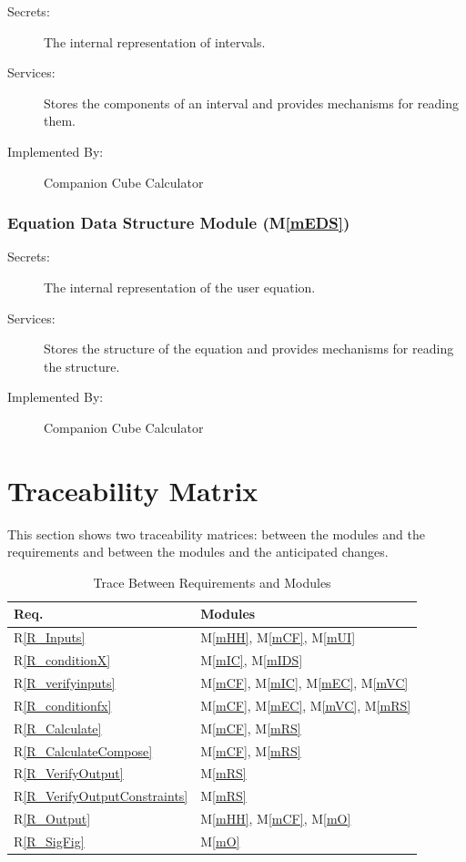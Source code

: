 \documentclass[12pt, titlepage]{article}
\newcommand{\rref}[1]{R\ref{#1}}
\newcommand{\mref}[1]{M\ref{#1}}
\newcommand{\progname}{Companion Cube Calculator} %
\begin{document}
\begin{description}
	\item[Secrets:]The internal representation of intervals.
	\item[Services:]Stores the components of an interval and provides 
	mechanisms for reading them.
	\item[Implemented By:] \progname{}
\end{description}

\subsubsection{Equation Data Structure Module (\mref{mEDS})}

\begin{description}
	\item[Secrets:]The internal representation of the user equation.
	\item[Services:]Stores the structure of the equation and provides 
	mechanisms for reading the structure.
	\item[Implemented By:] \progname{}
\end{description}

\section{Traceability Matrix} \label{SecTM}

This section shows two traceability matrices: between the modules and the
requirements and between the modules and the anticipated changes.


\begin{table}[H]
\centering
\begin{tabular}{p{} p{}}
\toprule
\textbf{Req.} & \textbf{Modules}\\
\midrule
\rref{R_Inputs} & \mref{mHH}, \mref{mCF}, \mref{mUI}\\
\rref{R_conditionX} & \mref{mIC}, \mref{mIDS}\\
\rref{R_verifyinputs} & \mref{mCF}, \mref{mIC}, \mref{mEC}, \mref{mVC}\\
\rref{R_conditionfx} & \mref{mCF}, \mref{mEC}, \mref{mVC}, \mref{mRS}\\
\rref{R_Calculate} & \mref{mCF}, \mref{mRS}\\
\rref{R_CalculateCompose} & \mref{mCF}, \mref{mRS}\\
\rref{R_VerifyOutput} & \mref{mRS}\\
\rref{R_VerifyOutputConstraints} & \mref{mRS}\\
\rref{R_Output} & \mref{mHH}, \mref{mCF}, \mref{mO}\\
\rref{R_SigFig} & \mref{mO}\\
\bottomrule
\end{tabular}
\caption{Trace Between Requirements and Modules}
\label{TblRT}
\end{table}
\end{document}
